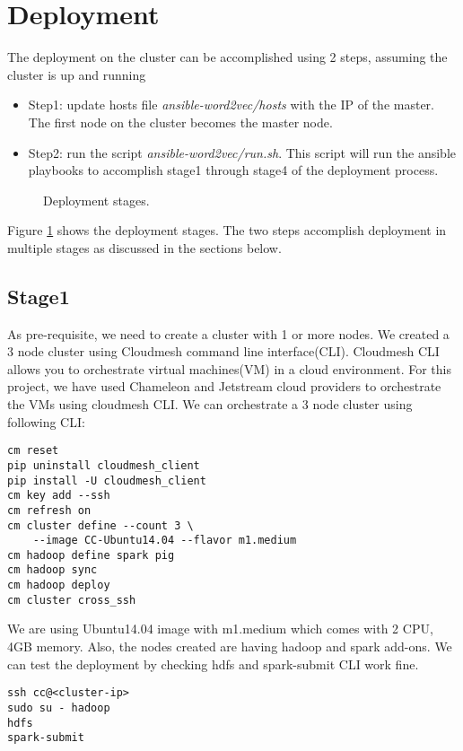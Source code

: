 \section{Deployment} \label{deploymentsection}

The deployment on the cluster can be accomplished using 2 steps, assuming the cluster
is up and running
\begin{itemize}[noitemsep]
\item Step1: update hosts file \textit{ansible-word2vec/hosts} with the IP of the master. 
The first node on the cluster becomes the master node.
\item Step2: run the script  \textit{ansible-word2vec/run.sh}. This script will run the ansible 
playbooks to accomplish stage1 through stage4 of the deployment process.
\end{itemize}

\begin{figure}[htbp]
\centering
{}
\caption{Deployment stages.}
\label{fig:deploymentstages}
\end{figure}

Figure \ref{fig:deploymentstages} shows the deployment stages. The two steps
accomplish deployment in multiple stages as discussed in the sections below.

\subsection{Stage1} \label{deploymentstage1} 
As pre-requisite, we need to create a cluster with 1 or more nodes.
We created a 3 node cluster using Cloudmesh \cite{www-cloudmesh} command line interface(CLI). 
Cloudmesh\cite{www-cloudmesh} CLI allows you to orchestrate virtual machines(VM) in a 
cloud environment. For this project, we have used Chameleon and Jetstream cloud 
providers to orchestrate the VMs using cloudmesh\cite{www-cloudmesh} CLI. We can orchestrate a 3 node 
cluster using following CLI:

\begin{verbatim}
cm reset
pip uninstall cloudmesh_client
pip install -U cloudmesh_client
cm key add --ssh
cm refresh on
cm cluster define --count 3 \
	--image CC-Ubuntu14.04 --flavor m1.medium
cm hadoop define spark pig
cm hadoop sync
cm hadoop deploy
cm cluster cross_ssh
\end{verbatim}   

We are using Ubuntu14.04 image with m1.medium which comes with 2 CPU, 4GB
memory. Also, the nodes created are having hadoop and spark add-ons.
We can test the deployment by checking hdfs and spark-submit CLI work fine.
\begin{verbatim}
ssh cc@<cluster-ip>
sudo su - hadoop
hdfs
spark-submit
\end{verbatim}

